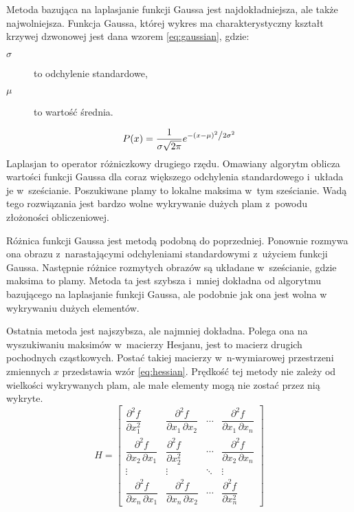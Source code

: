 Metoda bazująca na laplasjanie funkcji Gaussa jest najdokładniejsza, ale
także najwolniejsza.
Funkcja Gaussa, której wykres ma charakterystyczny kształt krzywej dzwonowej
jest dana wzorem \ref{eq:gaussian}, gdzie:
\begin{description}
	\item[$ \sigma $] to odchylenie standardowe,
	\item[$ \mu $] to wartość średnia.
\end{description}
\begin{equation}
	P(x) = \frac{1}{{\sigma \sqrt {2\pi } }}
	e^{{{ - \left( {x - \mu } \right)^2 }
	\mathord{\left/ {\vphantom {{ - \left( {x - \mu } \right)^2 }
	{2\sigma ^2 }}} \right. \kern-\nulldelimiterspace} {2\sigma ^2 }}}
\label{eq:gaussian}
\end{equation}
Laplasjan to operator różniczkowy drugiego rzędu.
Omawiany algorytm oblicza wartości funkcji Gaussa dla coraz większego
odchylenia standardowego i~układa je w~sześcianie.
Poszukiwane plamy to lokalne maksima w~tym sześcianie.
Wadą tego rozwiązania jest bardzo wolne wykrywanie dużych plam z~powodu
złożoności obliczeniowej.

Różnica funkcji Gaussa jest metodą podobną do poprzedniej.
Ponownie rozmywa ona obrazu z~narastającymi odchyleniami standardowymi
z~użyciem funkcji Gaussa.
Następnie różnice rozmytych obrazów są układane w~sześcianie, gdzie
maksima to plamy.
Metoda ta jest szybsza i~mniej dokładna od algorytmu bazującego na laplasjanie
funkcji Gaussa, ale podobnie jak ona jest wolna w wykrywaniu dużych elementów.

Ostatnia metoda jest najszybsza, ale najmniej dokładna.
Polega ona na wyszukiwaniu maksimów w~macierzy Hesjanu, jest to macierz
drugich pochodnych cząstkowych.
Postać takiej macierzy w~n-wymiarowej przestrzeni zmiennych $ x $ przedstawia
wzór \ref{eq:hessian}.
Prędkość tej metody nie zależy od wielkości wykrywanych plam, ale małe
elementy mogą nie zostać przez nią wykryte.
\begin{equation}
	H = \begin{bmatrix}
	\dfrac{\partial^2 f}{\partial x_1^2} & 
	\dfrac{\partial^2 f}{\partial x_1\,\partial x_2} & 
	\cdots & \dfrac{\partial^2 f}{\partial x_1\,\partial x_n} \\[2.2ex]
	\dfrac{\partial^2 f}{\partial x_2\,\partial x_1} &
	\dfrac{\partial^2 f}{\partial x_2^2} &
	\cdots & \dfrac{\partial^2 f}{\partial x_2\,\partial x_n} \\[2.2ex]
	\vdots & \vdots & \ddots & \vdots \\[2.2ex]
	\dfrac{\partial^2 f}{\partial x_n\,\partial x_1} &
	\dfrac{\partial^2 f}{\partial x_n\,\partial x_2} &
	\cdots &
	\dfrac{\partial^2 f}{\partial x_n^2}
	\end{bmatrix}
\label{eq:hessian}
\end{equation}


